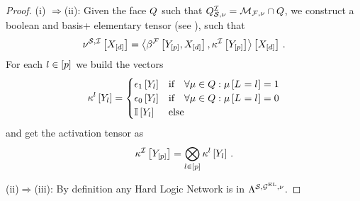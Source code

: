 \begin{proof}
(i)
    $\Rightarrow$(ii):
    Given the face $Q$ such that $Q^{\mathcal{I}}_{\mathcal{S},\nu}=\mathcal{M}_{\mathcal{F},\nu}\cap Q$, we construct a boolean and basis+ elementary tensor (see ), such that
    \begin{align*}
        \nu^{\mathcal{S},\mathcal{I}}\left[X_{[d]}\right]
        = \left\langle \beta^{\mathcal{F}}\left[Y_{[p]},X_{[d]}\right],\kappa^{\mathcal{I}}\left[Y_{[p]}\right]\right\rangle \left[ X_{[d]} \right] \, .
    \end{align*}
    For each $l\in[p]$ we build the vectors
    \begin{align*}
        \kappa^{l}\left[Y_{l}\right]
        = \begin{cases}
              \epsilon_1\left[Y_{l}\right] & \text{if} \quad \forall{\mu\in Q}:{\mu\left[L_{}=l_{}\right]=1} \\
              \epsilon_0\left[Y_{l}\right] & \text{if} \quad \forall{\mu\in Q}:{\mu\left[L_{}=l_{}\right]=0} \\
              \mathbb{I}\left[Y_{l}\right] & \text{else}
        \end{cases}
    \end{align*}
    and get the activation tensor as
    \begin{align*}
        \kappa^{\mathcal{I}}\left[Y_{[p]}\right]
        = \bigotimes_{l\in[p]} \kappa^{l}\left[Y_{l}\right] \, .
    \end{align*}

    (ii)$\Rightarrow$(iii):
    By definition any Hard Logic Network is in $\Lambda^{\mathcal{S},\mathcal{G}^{\mathrm{EL}},\nu}$.


\end{proof}

